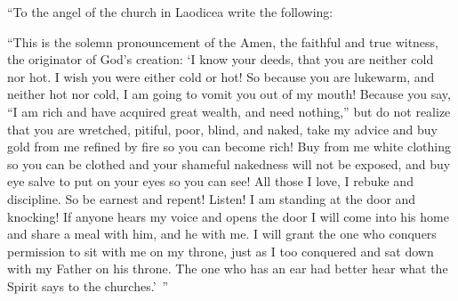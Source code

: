 {\par }{\PP {}“To the angel
of the church
in
Laodicea
write
the following:
\par }{\PP “This is the solemn pronouncement
of the Amen,
the faithful
and
true
witness,
the originator of God’s creation:
‘I know
your
deeds,
that
you are
neither
cold
nor
hot.
I wish
you were
either cold
or
hot!
So
because
you are
lukewarm,
and
neither
hot
nor
cold,
I am going to
vomit
you
out of
my
mouth!
Because
you say,
“I am
rich
and
have acquired great wealth,
and
need
nothing,”
but
do
not
realize
that
you
are
wretched,
pitiful,
poor,
blind,
and
naked,
take my advice
and buy
gold
from
me
refined
by
fire
so
you can become rich! Buy from me white
clothing
so
you can be clothed
and
your
shameful
nakedness
will
not
be exposed,
and buy eye salve
to put on
your
eyes
so
you can see!
All those
I love,
I rebuke
and
discipline.
So
be earnest
and
repent!
Listen! I am standing
at
the door
and
knocking! If
anyone
hears
my
voice
and
opens
the door
I will come
into
his home
and
share a meal
with
him,
and
he
with
me.
I will grant
the one
who conquers
permission to sit
with
me
on
my
throne,
just as
I too
conquered
and
sat down
with
my
Father
on
his
throne.
The one who has
an ear
had better hear
what
the Spirit
says
to the churches.’ ”

}
